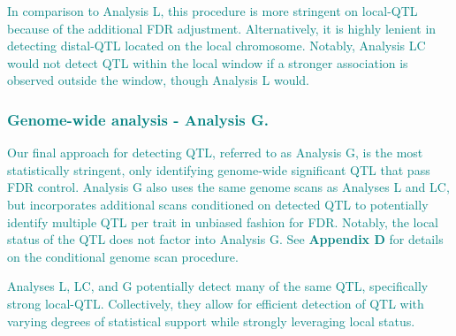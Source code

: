 \documentclass[9pt,twocolumn,twoside]{gsajnl}
\newcommand{\GKinline}[1]{\textcolor{teal}{#1}}
\begin{document}
\GKinline{In comparison to Analysis L, this procedure is more stringent on local-QTL because of the additional FDR adjustment. Alternatively, it is highly lenient in detecting distal-QTL located on the local chromosome. Notably, Analysis LC would not detect QTL within the local window if a stronger association is observed outside the window, though Analysis L would.}

\subsubsection{\GKinline{Genome-wide analysis - Analysis G.}} 
\GKinline{Our final approach for detecting QTL, referred to as Analysis G, is the most statistically stringent, only identifying genome-wide significant QTL that pass FDR control. Analysis G also uses the same genome scans as Analyses L and LC, but incorporates additional scans conditioned on detected QTL to potentially identify multiple QTL per trait in unbiased fashion for FDR. Notably, the local status of the QTL does not factor into Analysis G. See \textbf{Appendix D} for details on the conditional genome scan procedure.}

\GKinline{Analyses L, LC, and G potentially detect many of the same QTL, specifically strong local-QTL. Collectively, they allow for efficient detection of QTL with varying degrees of statistical support while strongly leveraging local status.}

\end{document}
